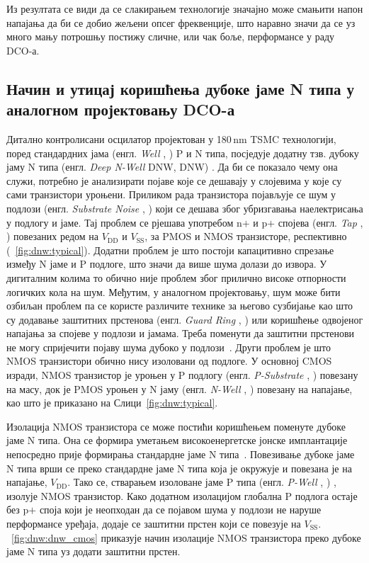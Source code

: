 \documentclass[master]{finthesis}
\makeatletter
\newcommand*{\engl}[2][\@empty]{%
    \edef\theacronym{#1}%
    (енгл. \foreignlanguage{english}{\emph{#2}%
    \ifx\theacronym\@empty \else , #1\fi})%
}
\def \DCO  {DCO} %
\makeatother
\begin{document}
Из резултата се види да се слакирањем технологије значајно може смањити напон напајања да би се добио жељени опсег фреквенције, што наравно значи да се уз много мању потрошњу постижу сличне, или чак боље, перформансе у раду \DCO-а. \par
\subsection{Начин и утицај коришћења дубоке јаме N типа у аналогном пројектовању \DCO-а}
Дитално контролисани осцилатор пројектован у 180\,nm TSMC технологији, поред стандардних јама \engl{Well} P и N типа, посједује додатну тзв. дубоку јаму N типа \engl[DNW]{Deep N-Well}. Да би се показало чему она служи, потребно је анализирати појаве које се дешавају у слојевима у које су сами транзистори уроњени. Приликом рада транзистора појављује се шум у подлози \engl{Substrate Noise} који се дешава због убризгавања наелектрисања у подлогу и јаме. Тај проблем се рјешава употребом n$+$ и p$+$ спојева \engl{Tap} повезаних редом на $V_\text{DD}$ и $V_\text{SS}$, за PMOS и NMOS транзисторе, респективно (\figurename~\ref{fig:dnw:typical}). Додатни проблем је што постоји капацитивно спрезање између N јаме и P подлоге, што значи да више шума долази до извора. У дигиталним колима то обично није проблем због прилично високе отпорности логичких кола на шум. Међутим, у аналогном пројектовању, шум може бити озбиљан проблем па се користе различите технике за његово сузбијање као што су додавање заштитних прстенова \engl{Guard Ring} или коришћење одвојеног напајања за спојеве у подлози и јамама. Треба поменути да заштитни прстенови не могу спријечити појаву шума дубоко у подлози~\cite{DNW:aspencore}. Други проблем је што NMOS транзистори обично нису изоловани од подлоге. У основној CMOS изради, NMOS транзистор је уроњен у P подлогу \engl{P-Substrate} повезану на масу, док је PMOS уроњен у N јаму \engl{N-Well} повезану на напајање, као што је приказано на Слици~\ref{fig:dnw:typical}. \par

Изолација NMOS транзистора се може постићи коришћењем поменуте дубоке јаме N типа. Она се формира уметањем високоенергетске јонске имплантације непосредно прије формирања стандардне јаме N типа~\cite{DNW:1503847}. Повезивање дубоке јаме N типа врши се преко стандардне јаме N типа која је окружује и повезана је на напајање, $V_\text{DD}$. Тако се, стварањем изоловане јаме P типа \engl{P-Well}, изолује NMOS транзистор. Како додатном изолацијом глобална P подлога остаје без p$+$ споја који је неопходан да се појавом шума у подлози не наруше перформансе уређаја, додаје се заштитни прстен који се повезује на $V_\text{SS}$. \figurename~\ref{fig:dnw:dnw_cmos} приказује начин изолације NMOS транзистора преко дубоке јаме N типа уз додати заштитни прстен. \par
\end{document}
